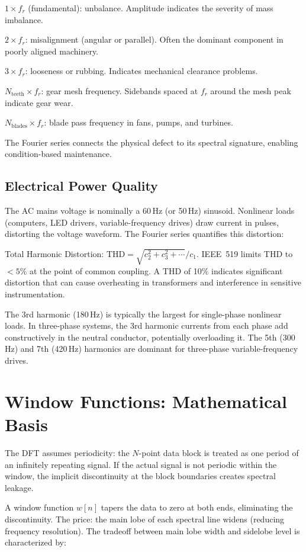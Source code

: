 \documentclass[11pt,letterpaper,twoside,openany]{book}
\begin{document}
$1 \times f_r$ (fundamental): unbalance. Amplitude indicates the severity of mass imbalance.

$2 \times f_r$: misalignment (angular or parallel). Often the dominant component in poorly aligned machinery.

$3 \times f_r$: looseness or rubbing. Indicates mechanical clearance problems.

$N_{\text{teeth}} \times f_r$: gear mesh frequency. Sidebands spaced at $f_r$ around the mesh peak indicate gear wear.

$N_{\text{blades}} \times f_r$: blade pass frequency in fans, pumps, and turbines.

The Fourier series connects the physical defect to its spectral signature, enabling condition-based maintenance.

\subsection{Electrical Power Quality}
The AC mains voltage is nominally a 60\,Hz (or 50\,Hz) sinusoid. Nonlinear loads (computers, LED drivers, variable-frequency drives) draw current in pulses, distorting the voltage waveform. The Fourier series quantifies this distortion:

Total Harmonic Distortion: $\text{THD} = \sqrt{c_2^2 + c_3^2 + \cdots}/c_1$. IEEE~519 limits THD to $< 5\%$ at the point of common coupling. A THD of 10\% indicates significant distortion that can cause overheating in transformers and interference in sensitive instrumentation.

The 3rd harmonic (180\,Hz) is typically the largest for single-phase nonlinear loads. In three-phase systems, the 3rd harmonic currents from each phase add constructively in the neutral conductor, potentially overloading it. The 5th (300\,Hz) and 7th (420\,Hz) harmonics are dominant for three-phase variable-frequency drives.

\section{Window Functions: Mathematical Basis}
The DFT assumes periodicity: the $N$-point data block is treated as one period of an infinitely repeating signal. If the actual signal is not periodic within the window, the implicit discontinuity at the block boundaries creates spectral leakage.

A window function $w[n]$ tapers the data to zero at both ends, eliminating the discontinuity. The price: the main lobe of each spectral line widens (reducing frequency resolution). The tradeoff between main lobe width and sidelobe level is characterized by:
\end{document}
